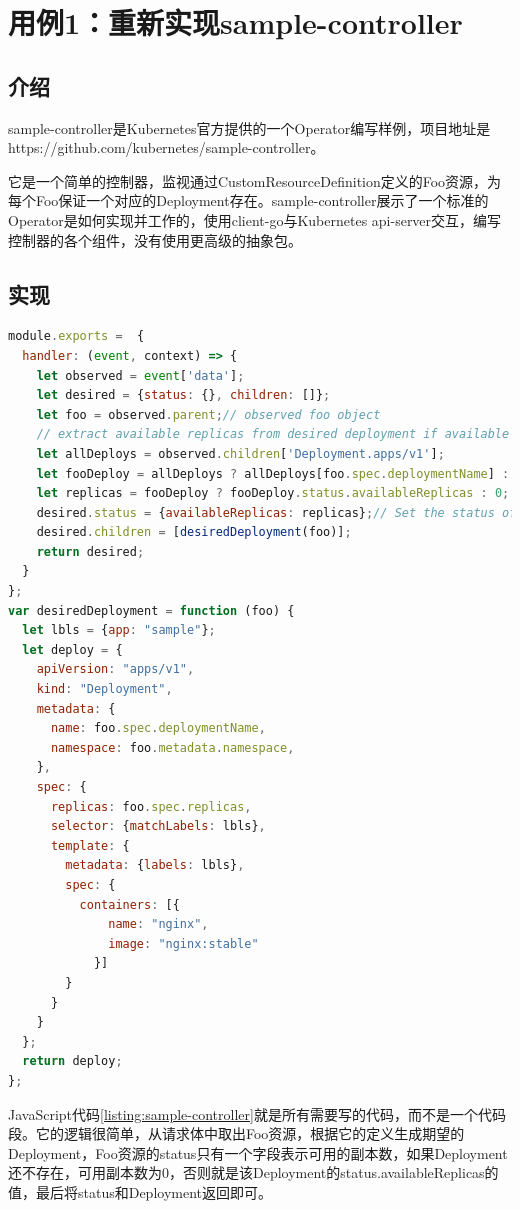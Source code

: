 \documentclass[macfonts,master]{njuthesis}
\begin{document}
\section{用例1：重新实现sample-controller}
\subsection{介绍}
sample-controller是Kubernetes官方提供的一个Operator编写样例，项目地址是https://github.com/kubernetes/sample-controller。

它是一个简单的控制器，监视通过CustomResourceDefinition定义的Foo资源，为每个Foo保证一个对应的Deployment存在。sample-controller展示了一个标准的Operator是如何实现并工作的，使用client-go与Kubernetes api-server交互，编写控制器的各个组件，没有使用更高级的抽象包。
\subsection{实现}
\begin{lstlisting}[language=JavaScript,caption=sample-controller的实现代码,label=listing:sample-controller]
module.exports =  {
  handler: (event, context) => {
    let observed = event['data'];
    let desired = {status: {}, children: []};
    let foo = observed.parent;// observed foo object
    // extract available replicas from desired deployment if available
    let allDeploys = observed.children['Deployment.apps/v1'];
    let fooDeploy = allDeploys ? allDeploys[foo.spec.deploymentName] : null;
    let replicas = fooDeploy ? fooDeploy.status.availableReplicas : 0;
    desired.status = {availableReplicas: replicas};// Set the status of Foo
    desired.children = [desiredDeployment(foo)];
    return desired;
  }
};
var desiredDeployment = function (foo) {
  let lbls = {app: "sample"};
  let deploy = {
    apiVersion: "apps/v1",
    kind: "Deployment",
    metadata: {
      name: foo.spec.deploymentName,
      namespace: foo.metadata.namespace,
    },
    spec: {
      replicas: foo.spec.replicas,
      selector: {matchLabels: lbls},
      template: {
        metadata: {labels: lbls},
        spec: {
          containers: [{
              name: "nginx",
              image: "nginx:stable"
            }]
        }
      }
    }
  };
  return deploy;
};
\end{lstlisting}

JavaScript代码\ref{listing:sample-controller}就是所有需要写的代码，而不是一个代码段。它的逻辑很简单，从请求体中取出Foo资源，根据它的定义生成期望的Deployment，Foo资源的status只有一个字段表示可用的副本数，如果Deployment还不存在，可用副本数为0，否则就是该Deployment的status.availableReplicas的值，最后将status和Deployment返回即可。
\end{document}
